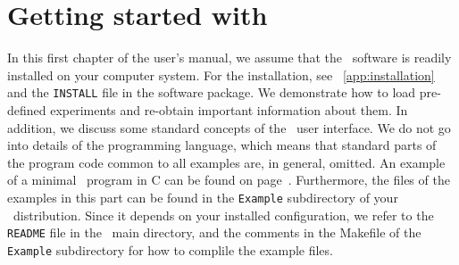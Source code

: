 \chapter{Getting started with \GLOBES }
\label{chapt:gettingstarted}

In this first chapter of the user's manual, we assume that the \GLOBES\ software is readily installed on your computer system. For the installation,
see \App~\ref{app:installation} and the {\tt INSTALL} file in the
software package. We demonstrate how to load pre-defined experiments 
and re-obtain important information about them. In addition, we discuss
some standard concepts of the \GLOBES\ user interface. We do not go
into details of the programming language, which means that standard parts
of the program code common to all examples are, in general, omitted.
An example of a minimal \GLOBES\ program in C can be found on page~\pageref{ex:c}. Furthermore, the files of the examples in this part can be found in the {\tt Example} subdirectory of your \GLOBES\ distribution.  Since it depends on your installed
configuration, we refer to the {\tt README} file in the \GLOBES\ main directory, and the comments in the Makefile of the {\tt Example} subdirectory for how to complile the example files.

